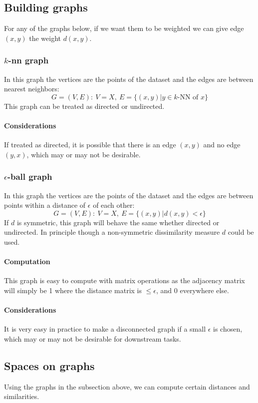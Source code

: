 \documentclass[12pt,a4paper]{article}
\newcommand{\1}[1]{\mathds{1}\left[#1\right]}
\begin{document}
\subsection{Building graphs} \label{sec:graphs}
For any of the graphs below, if we want them to be weighted we can give edge $(x,y)$ the weight $d(x,y)$.
\subsubsection{\texorpdfstring{$k$-nn}{k-nn} graph}
In this graph the vertices are the points of the dataset and the edges are between nearest neighbors:
\[G=(V,E):\ V=X,\ E=\{(x,y)|y\in k\text{-NN of }x\}\]
This graph can be treated as directed or undirected.

\paragraph{Considerations} If treated as directed, it is possible that there is an edge $(x,y)$ and no edge $(y,x)$, which may or may not be desirable.

\subsubsection{\texorpdfstring{$\epsilon$}{ε}-ball graph}\label{sec:epsilonballgraph}
In this graph the vertices are the points of the dataset and the edges are between points within a distance of $\epsilon$ of each other:
\[G=(V,E):\ V=X,\ E=\{(x,y)|d(x,y)<\epsilon\}\]
If $d$ is symmetric, this graph will behave the same whether directed or undirected. In principle though a non-symmetric dissimilarity measure $d$ could be used.

\paragraph{Computation} This graph is easy to compute with matrix operations as the adjacency matrix will simply be 1 where the distance matrix is $\leq \epsilon$, and 0 everywhere else.

\paragraph{Considerations} It is very easy in practice to make a disconnected graph if a small $\epsilon$ is chosen, which may or may not be desirable for downstream tasks.

\subsection{Spaces on graphs}
Using the graphs in the subsection above, we can compute certain distances and similarities.
\end{document}
